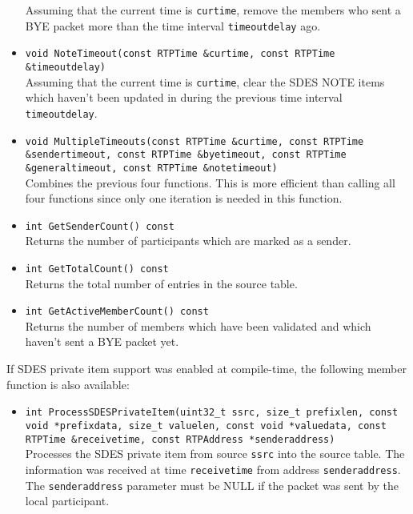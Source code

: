 \documentclass[12pt,a4paper]{article}
\begin{document}
\begin{itemize}
						Assuming that the current time is {\tt curtime}, remove the
						members who sent a BYE packet more than the time interval
						{\tt timeoutdelay} ago.
					\item {\tt void NoteTimeout(const RTPTime \&curtime, const RTPTime \&timeoutdelay)}\\
						Assuming that the current time is {\tt curtime}, clear the SDES 
						NOTE items which haven't been updated in during the previous
						time interval {\tt timeoutdelay}.
					\item {\tt void MultipleTimeouts(const RTPTime \&curtime, const RTPTime \&sendertimeout,
					                                 const RTPTime \&byetimeout, const RTPTime \&generaltimeout,
					                                 const RTPTime \&notetimeout)}\\
						Combines the previous four functions. This is more efficient
						than calling all four functions since only one iteration
						is needed in this function.
					\item {\tt int GetSenderCount() const}\\
						Returns the number of participants which are marked as a
						sender.
					\item {\tt int GetTotalCount() const}\\
						Returns the total number of entries in the source table.
					\item {\tt int GetActiveMemberCount() const}\\
						Returns the number of members which have been validated and
						which haven't sent a BYE packet yet.
				\end{itemize}
				
				If SDES private item support was enabled at compile-time, the following
				member function is also available: 
				\begin{itemize}
					\item {\tt int ProcessSDESPrivateItem(uint32\_t ssrc, size\_t prefixlen, const void *prefixdata,
	                                                      size\_t valuelen, const void *valuedata, const RTPTime \&receivetime,
					                                      const RTPAddress *senderaddress)}\\
						Processes the SDES private item from source {\tt ssrc}
						into the source table. The information was received at
						time {\tt receivetime} from address {\tt senderaddress}.
						The {\tt senderaddress} parameter must be NULL if the
						packet was sent by the local participant.
				\end{itemize}
\end{document}

